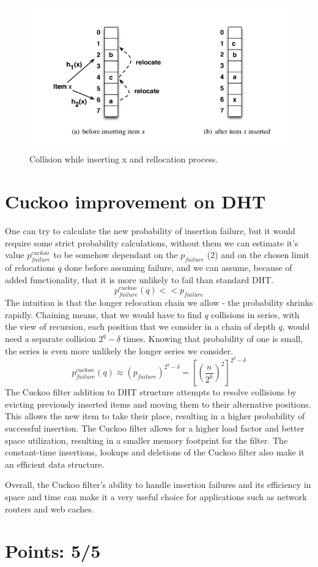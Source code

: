\documentclass{article}
\begin{document}
    \clearpage
    \begin{figure}[ht]
        \includegraphics[width=.9\textwidth]{./cockoo.png}
        \caption{Collision while inserting x and rellocation process.}
    \end{figure}

    \section{Cuckoo improvement on DHT}

    One can try to calculate the new probability of insertion failure, but it would require some strict probability calculations, without them we can estimate it's value $p_{failure}^{cuckoo}$ to be somehow dependant on the $p_{failure}$ (2) and on the chosen limit of relocations $q$ done before assuming failure, and we can assume, because of added functionality, that it is more unlikely to fail than standard DHT.
    $$p_{failure}^{cuckoo}(q) << p_{failure}$$
    The intuition is that the longer relocation chain we allow - the probability shrinks rapidly. Chaining means, that we would have to find $q$ collisions in series, with the view of recursion, each position that we consider in a chain of depth $q$, would need a separate collision $2^q-\delta$ times. Knowing that probability of one is small, the  series is even more unlikely the longer series we consider.
    $$p_{failure}^{cuckoo}(q) \approx (p_{failure})^{2^q-\delta} = \left[\left(\frac{n}{2^k}\right)^2\right]^{2^q-\delta}$$
    The Cuckoo filter addition to DHT structure attempts to resolve collisions by evicting previously inserted items and moving them to their alternative positions. This allows the new item to take their place, resulting in a higher probability of successful insertion. The Cuckoo filter allows for a higher load factor and better space utilization, resulting in a smaller memory footprint for the filter. The constant-time insertions, lookups and deletions of the Cuckoo filter also make it an efficient data structure.

    Overall, the Cuckoo filter's ability to handle insertion failures and its efficiency in space and time can make it a very useful choice for applications such as network routers and web caches.

    \section{Points: 5/5}
\end{document}
